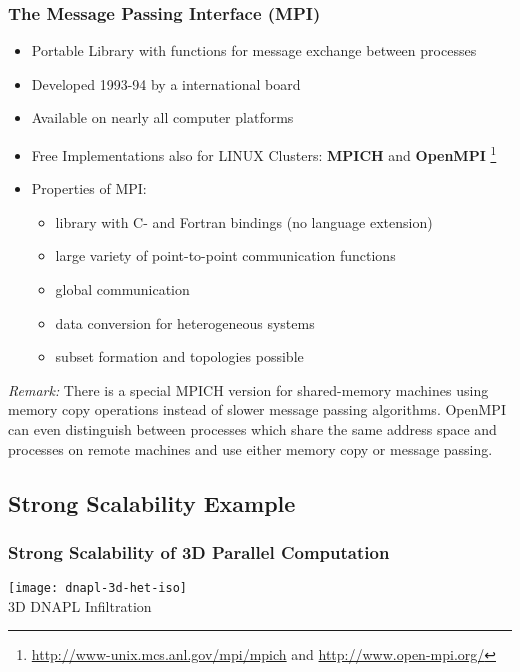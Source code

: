\begin{frame}
\frametitle{The Message Passing Interface (MPI)}

\begin{itemize}
\item Portable Library with functions for message exchange between processes
\item Developed 1993-94 by a international board
\item Available on nearly all computer platforms
\item Free Implementations also for LINUX Clusters: {\bfseries MPICH}
 and {\bfseries OpenMPI} \footnote{\tiny \url{http://www-unix.mcs.anl.gov/mpi/mpich} and \url{http://www.open-mpi.org/}}
\item Properties of MPI:
\begin{itemize}
\item library with C- and Fortran bindings (no language extension)
\item large variety of point-to-point communication functions
\item global communication
\item data conversion for heterogeneous systems
\item subset formation and topologies possible
\end{itemize}
\end{itemize}
\begin{footnotesize}\textit{Remark:} There is a special MPICH version for shared-memory machines using memory copy operations instead of slower message passing algorithms.
OpenMPI can even distinguish between processes which share the same address space and
processes on remote machines and use either memory copy or message passing.

\end{footnotesize}
\end{frame}

\subsection{Strong Scalability Example}
\begin{frame}
\frametitle<presentation>{Strong Scalability of 3D Parallel Computation}
\begin{center}
\texttt{[image: dnapl-3d-het-iso]}\\
3D DNAPL Infiltration
\end{center}
\end{frame}


